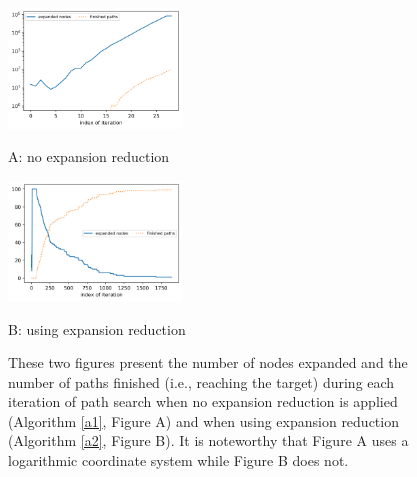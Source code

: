 \documentclass[letterpaper, 10 pt, journal, twoside]{IEEEtran}
\begin{document}
\begin{figure}[t] \scriptsize
\begin{minipage}{.48\linewidth}
  \centerline{\includegraphics[width=4.6cm]{no_expansion.png}}
  \centerline{A: no expansion reduction}
\end{minipage}
\hfill
\begin{minipage}{.48\linewidth}
  \centerline{\includegraphics[width=4.6cm]{with_expansion.png}}
  \centerline{B: using expansion reduction}
\end{minipage}
\vfill

\caption{These two figures present the number of nodes expanded and the number of paths finished (i.e., reaching the target) during each iteration of path search when no expansion reduction is applied (Algorithm \ref{a1}, Figure A) and when using expansion reduction (Algorithm \ref{a2}, Figure B). It is noteworthy that Figure A uses a logarithmic coordinate system while Figure B does not.
}
\label{expansion_reduction_comparison}
\end{figure}
  

\end{document}

